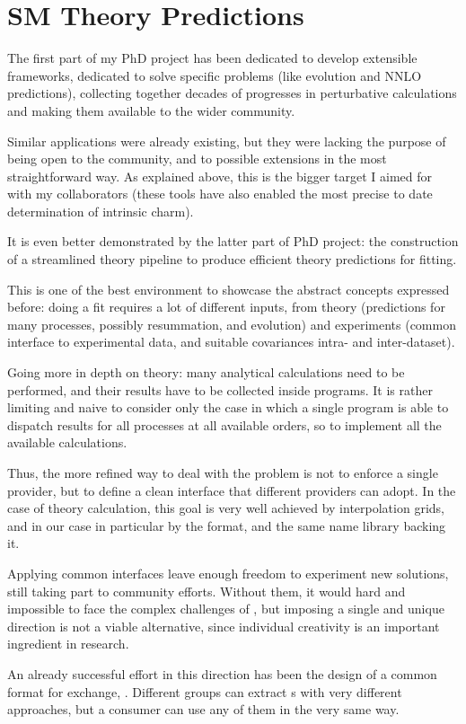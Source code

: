 \section{SM Theory Predictions}


 The first part of my PhD project has been dedicated to develop
extensible frameworks, dedicated to solve specific problems (like \dglap
evolution and NNLO \dis predictions), collecting together decades of progresses
in perturbative \qcd calculations and making them available to the wider
community.

Similar applications were already existing, but they were lacking the purpose
of being open to the community, and to possible extensions in the most
straightforward way.
As explained above, this is the bigger target I aimed for with my collaborators
(these tools have also enabled the most precise to date determination of
intrinsic charm).
\bigskip

 It is even better demonstrated by the latter part of PhD
project: the construction of a streamlined theory pipeline to produce efficient
theory predictions for \pdf fitting.

This is one of the best environment to showcase the abstract concepts expressed
before: doing a \pdf fit requires a lot of different inputs, from theory
(predictions for many processes, possibly resummation, and \pdf evolution) and
experiments (common interface to experimental data, and suitable covariances
intra- and inter-dataset).

Going more in depth on theory: many analytical calculations need to be
performed, and their results have to be collected inside programs.
It is rather limiting and naive to consider only the case in which a single
program is able to dispatch results for all processes at all available orders,
so to implement all the available calculations.

Thus, the more refined way to deal with the problem is not to enforce a single
provider, but to define a clean interface that different providers can adopt.
In the case of theory calculation, this goal is very well achieved by
interpolation grids, and in our case in particular by the \pineappl format, and
the same name library backing it.
\bigskip

Applying common interfaces leave enough freedom to experiment new solutions,
still taking part to community efforts. Without them, it would hard and
impossible to face the complex challenges of \hep, but imposing a single and
unique direction is not a viable alternative, since individual creativity is an
important ingredient in research.

An already successful effort in this direction has been the design of a common
format for \pdf exchange, \lhapdf. Different groups can extract \pdf{}s with very
different approaches, but a consumer can use any of them in the very same way.
